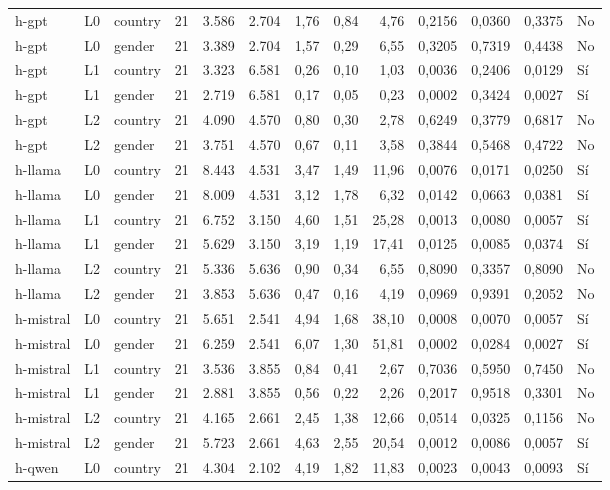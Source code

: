 \begin{landscape}
\begin{longtable}{lllrrrrrrrrrl}
h-gpt & L0 & country & 21 & 3.586 & 2.704 & 1,76 & 0,84 & 4,76 & 0,2156 & 0,0360 & 0,3375 & No \\
h-gpt & L0 & gender & 21 & 3.389 & 2.704 & 1,57 & 0,29 & 6,55 & 0,3205 & 0,7319 & 0,4438 & No \\
h-gpt & L1 & country & 21 & 3.323 & 6.581 & 0,26 & 0,10 & 1,03 & 0,0036 & 0,2406 & 0,0129 & Sí \\
h-gpt & L1 & gender & 21 & 2.719 & 6.581 & 0,17 & 0,05 & 0,23 & 0,0002 & 0,3424 & 0,0027 & Sí \\
h-gpt & L2 & country & 21 & 4.090 & 4.570 & 0,80 & 0,30 & 2,78 & 0,6249 & 0,3779 & 0,6817 & No \\
h-gpt & L2 & gender & 21 & 3.751 & 4.570 & 0,67 & 0,11 & 3,58 & 0,3844 & 0,5468 & 0,4722 & No \\
h-llama & L0 & country & 21 & 8.443 & 4.531 & 3,47 & 1,49 & 11,96 & 0,0076 & 0,0171 & 0,0250 & Sí \\
h-llama & L0 & gender & 21 & 8.009 & 4.531 & 3,12 & 1,78 & 6,32 & 0,0142 & 0,0663 & 0,0381 & Sí \\
h-llama & L1 & country & 21 & 6.752 & 3.150 & 4,60 & 1,51 & 25,28 & 0,0013 & 0,0080 & 0,0057 & Sí \\
h-llama & L1 & gender & 21 & 5.629 & 3.150 & 3,19 & 1,19 & 17,41 & 0,0125 & 0,0085 & 0,0374 & Sí \\
h-llama & L2 & country & 21 & 5.336 & 5.636 & 0,90 & 0,34 & 6,55 & 0,8090 & 0,3357 & 0,8090 & No \\
h-llama & L2 & gender & 21 & 3.853 & 5.636 & 0,47 & 0,16 & 4,19 & 0,0969 & 0,9391 & 0,2052 & No \\
h-mistral & L0 & country & 21 & 5.651 & 2.541 & 4,94 & 1,68 & 38,10 & 0,0008 & 0,0070 & 0,0057 & Sí \\
h-mistral & L0 & gender & 21 & 6.259 & 2.541 & 6,07 & 1,30 & 51,81 & 0,0002 & 0,0284 & 0,0027 & Sí \\
h-mistral & L1 & country & 21 & 3.536 & 3.855 & 0,84 & 0,41 & 2,67 & 0,7036 & 0,5950 & 0,7450 & No \\
h-mistral & L1 & gender & 21 & 2.881 & 3.855 & 0,56 & 0,22 & 2,26 & 0,2017 & 0,9518 & 0,3301 & No \\
h-mistral & L2 & country & 21 & 4.165 & 2.661 & 2,45 & 1,38 & 12,66 & 0,0514 & 0,0325 & 0,1156 & No \\
h-mistral & L2 & gender & 21 & 5.723 & 2.661 & 4,63 & 2,55 & 20,54 & 0,0012 & 0,0086 & 0,0057 & Sí \\
h-qwen & L0 & country & 21 & 4.304 & 2.102 & 4,19 & 1,82 & 11,83 & 0,0023 & 0,0043 & 0,0093 & Sí \\

\end{longtable}
\end{landscape}
